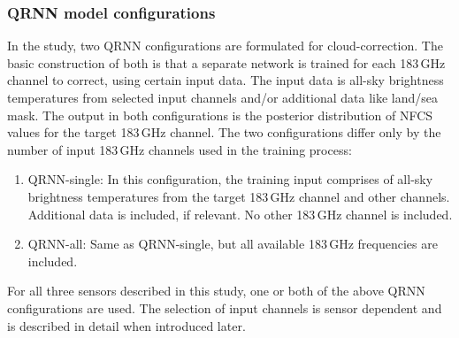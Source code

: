 \documentclass[amt, manuscript]{copernicus}
\begin{document}
\subsubsection{QRNN model configurations}
%
\label{sec:QRNN_configuration}
In the study, two QRNN configurations are formulated for cloud-correction. The
basic construction of both is that a separate network is trained for each
183\,GHz channel to correct, using certain input data. The input data is all-sky brightness temperatures from selected input channels and/or additional data like land/sea mask. The
output in both configurations is the posterior distribution of NFCS values for
the target 183\,GHz channel. The two configurations differ only by the number of
input 183\,GHz channels used in the training process:

\begin{enumerate}
	\item QRNN-single: In this configuration, the training input comprises of  all-sky brightness temperatures from the target 183\,GHz channel and other channels. Additional data is included, if relevant. No other 183\,GHz channel is included.  
	
	\item QRNN-all: Same as QRNN-single, but all available 183\,GHz frequencies are included.      
\end{enumerate}

For all three sensors described in this study, one or both of the above QRNN configurations are used. The selection of input channels is sensor dependent and is described in detail when introduced later.  
\end{document}
